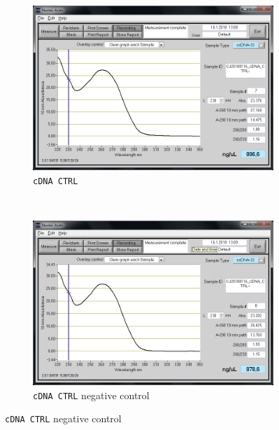 \begin{figure}[H]
        \begin{subfigure}[b]{0.49\textwidth}
        \includegraphics[width=\textwidth]{graphics/screenshots/CJ20180116_cDNA_CTRL-.png}
        \caption{\texttt{cDNA CTRL}}
        \label{sfig:CJ20180116_cDNA_CTRL-}
    \end{subfigure}
    ~ 
    \begin{subfigure}[b]{0.49\textwidth}
        \includegraphics[width=\textwidth]{graphics/screenshots/CJ20180116_cDNA_CTRL--.png}
        \caption{\texttt{cDNA CTRL} negative control}
        \label{sfig:CJ20180116_cDNA_CTRL--}
    \end{subfigure}
\end{figure}



